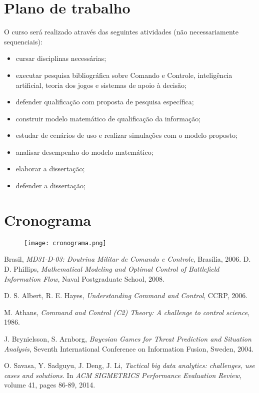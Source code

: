 \documentclass[a4paper,12pt]{article}
\begin{document}
\section{Plano de trabalho}
O curso será realizado através das seguintes atividades (não necessariamente sequenciais):
\begin{itemize}
 \item cursar disciplinas necessárias;
 \item executar pesquisa bibliográfica sobre Comando e Controle, inteligência artificial, teoria dos jogos e sistemas de apoio 
 à decisão;
 \item defender qualificação com proposta de pesquisa específica;
 \item construir modelo matemático de qualificação da informação;
 \item estudar de cenários de uso e realizar simulações com o modelo proposto;
 \item analisar desempenho do modelo matemático;
  \item elaborar a dissertação;
 \item defender a dissertação;
\end{itemize}

\section{Cronograma}
\begin{figure}[!hbp]
  \centering
  \texttt{[image: cronograma.png]}
\end{figure}

\begin{thebibliography}{1}

Brasil, \emph{MD31-D-03: Doutrina Militar de Comando e Controle}, Brasília, 2006.
D. D. Phillips, \emph{Mathematical Modeling and Optimal Control of Battlefield Information Flow}, Naval Postgraduate School, 
2008.

D. S. Albert, R. E. Hayes, \emph{Understanding Command and Control}, CCRP, 2006.

M. Athans, \emph{Command and Control (C2) Theory: A challenge to control science}, 1986.

J. Brynielsson, S. Arnborg, \emph{Bayesian Games for Threat Prediction and Situation Analysis}, Seventh International
Conference on Information Fusion, Sweden, 2004.

O. Savasa, Y. Sadguyu, J. Deng, J. Li, \emph{Tactical big data analytics: challenges, use cases and solutions.} In 
\textit{ACM SIGMETRICS Performance Evaluation Review}, volume 41, pages 86-89, 2014.

\end{thebibliography}
\end{document}
